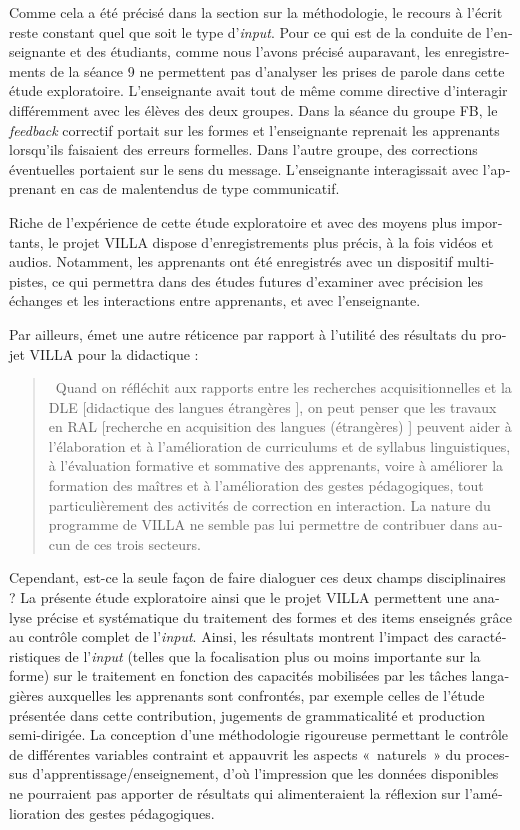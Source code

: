 \documentclass[output=paper]{langscibook}
\begin{document}
\begin{otherlanguage}{french}
Comme cela a été précisé dans la section sur la méthodologie, le recours à l’écrit reste constant quel que soit le type d’\textit{input}. Pour ce qui est de la conduite de l’enseignante et des étudiants, comme nous l’avons précisé auparavant, les enregistrements de la séance 9 ne permettent pas d’analyser les prises de parole dans cette étude exploratoire. L’enseignante avait tout de même comme directive d’interagir différemment avec les élèves des deux groupes. Dans la séance du groupe FB, le \textit{feedback} correctif portait sur les formes et l’enseignante reprenait les apprenants lorsqu’ils faisaient des erreurs formelles. Dans l’autre groupe, des corrections éventuelles portaient sur le sens du message. L’enseignante interagissait avec l’apprenant en cas de malentendus de type communicatif.

Riche de l’expérience de cette étude exploratoire et avec des moyens plus importants, le projet VILLA dispose d’enregistrements plus précis, à la fois vidéos et audios. Notamment, les apprenants ont été enregistrés avec un dispositif multi-pistes, ce qui permettra dans des études futures d’examiner avec précision les échanges et les interactions entre apprenants, et avec l’enseignante.

Par ailleurs, \citet[174]{Véronique2021} émet une autre réticence par rapport à l’utilité des résultats du projet VILLA pour la didactique :

\begin{quote}
~Quand on réfléchit aux rapports entre les recherches acquisitionnelles et la DLE [didactique des langues étrangères ], on peut penser que les travaux en RAL [recherche en acquisition des langues (étrangères) ] peuvent aider à l’élaboration et à l’amélioration de curriculums et de syllabus linguistiques, à l’évaluation formative et sommative des apprenants, voire à améliorer la formation des maîtres et à l’amélioration des gestes pédagogiques, tout particulièrement des activités de correction en interaction. La nature du programme de VILLA ne semble pas lui permettre de contribuer dans aucun de ces trois secteurs.~
\end{quote}

Cependant, est-ce la seule façon de faire dialoguer ces deux champs disciplinaires ? La présente étude exploratoire ainsi que le projet VILLA permettent une analyse précise et systématique du traitement des formes et des items enseignés grâce au contrôle complet de l’\textit{input}. Ainsi, les résultats montrent l’impact des caractéristiques de l’\textit{input} (telles que la focalisation plus ou moins importante sur la forme) sur le traitement en fonction des capacités mobilisées par les tâches langagières auxquelles les apprenants sont confrontés, par exemple celles de l’étude présentée dans cette contribution, jugements de grammaticalité et production semi-dirigée. La conception d’une méthodologie rigoureuse permettant le contrôle de différentes variables contraint et appauvrit les aspects «~naturels~» du processus d’apprentissage\slash enseignement, d’où l’impression que les données disponibles ne pourraient pas apporter de résultats qui alimenteraient la réflexion sur l’amélioration des gestes pédagogiques.


\end{otherlanguage}
\end{document}
